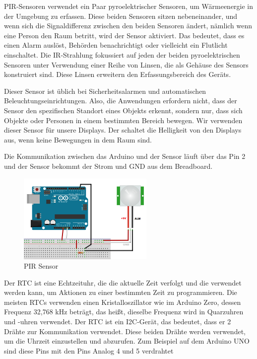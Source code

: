 \documentclass[conference]{IEEEtran}
\begin{document}
PIR-Sensoren verwendet ein Paar pyroelektrischer Sensoren, um Wärmeenergie in der Umgebung zu erfassen. Diese beiden Sensoren sitzen nebeneinander, und wenn sich die Signaldifferenz zwischen den beiden Sensoren ändert, nämlich wenn eine Person den Raum betritt, wird der Sensor aktiviert. Das bedeutet, dass es einen Alarm auslöst, Behörden benachrichtigt oder vielleicht ein Flutlicht einschaltet. Die IR-Strahlung fokussiert auf jeden der beiden pyroelektrischen Sensoren unter Verwendung einer Reihe von Linsen, die als Gehäuse des Sensors konstruiert sind. Diese Linsen erweitern den Erfassungsbereich des Geräts.

Dieser Sensor ist üblich bei Sicherheitsalarmen und automatischen Beleuchtungseinrichtungen. Also, die Anwendungen erfordern nicht, dass der Sensor den spezifischen Standort eines Objekts erkennt, sondern nur, dass sich Objekte oder Personen in einem bestimmten Bereich bewegen. Wir verwenden dieser Sensor für unsere Displays. Der schaltet die Helligkeit von den Displays aus, wenn keine Bewegungen in dem Raum sind.

Die Kommunikation zwischen das Arduino und der Sensor läuft über das Pin 2 und der Sensor bekommt der Strom und GND aus dem Breadboard. 

\begin{figure}[h]
	\centering
	\includegraphics[width=0.8\linewidth]{fig29}
	\caption{PIR Sensor}
	\label{fig:fig29}
\end{figure}

Der RTC ist eine Echtzeituhr, die die aktuelle Zeit verfolgt und die verwendet werden kann, um Aktionen zu einer bestimmten Zeit zu programmieren. Die meisten RTCs verwenden einen Kristalloszillator wie im Arduino Zero, dessen Frequenz 32,768 kHz beträgt, das heißt, dieselbe Frequenz wird in Quarzuhren und -uhren verwendet. 
Der RTC ist ein I2C-Gerät, das bedeutet, dass er 2 Drähte zur Kommunikation verwendet. Diese beiden Drähte werden verwendet, um die Uhrzeit einzustellen und abzurufen. Zum Beispiel auf dem Arduino UNO sind diese Pins mit den Pins Analog 4 und 5 verdrahtet
\end{document}
